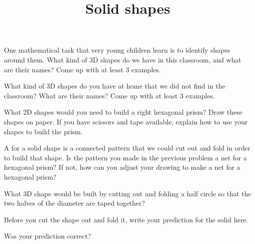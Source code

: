 \documentclass[nooutcomes,noauthor]{ximera}
\title{Solid shapes}
\begin{document}
\begin{abstract}
\end{abstract}

\maketitle

\begin{problem}
One mathematical task that very young children learn is to identify shapes around them. What kind of 3D shapes do we have in this classroom, and what are their names? Come up with at least $3$ examples.
\end{problem}

\begin{problem}
What kind of 3D shapes do you have at home that we did not find in the classroom? What are their names? Come up with at least $3$ examples.
\end{problem}

\begin{problem}
What 2D shapes would you need to build a right hexagonal prism? Draw these shapes on paper. If you have scissors and tape available, explain how to use your shapes to build the prism.
\end{problem}

\begin{problem}
A  for a solid shape is a connected pattern that we could cut out and fold in order to build that shape. Is the pattern you made in the previous problem a net for a hexagonal prism? If not, how can you adjust your drawing to make a net for a hexagonal prism?
\end{problem}

\begin{problem}
What 3D shape would be built by cutting out and folding a half circle so that the two halves of the diameter are taped together?

Before you cut the shape out and fold it, write your prediction for the solid here.

\begin{image}
\end{image}

Was your prediction correct?
\end{problem}
\newpage
\end{document}

